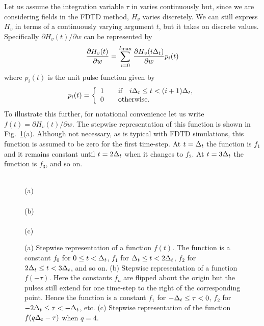 Let us assume the integration variable $\tau$ in
 varies continuously but, since we are
considering fields in the FDTD method, $H_v$ varies discretely.  We
can still express $H_v$ in terms of a continuously varying argument
$t$, but it takes on discrete values.  Specifically $\partial
H_v(t)/\partial w$ can be represented by
\begin{equation}
  \frac{\partial H_v(t)}{\partial w} =
  \sum_{i=0}^{I_{\mbox{\scriptsize max}}}
   \frac{\partial H_v(i\Delta_t)}{\partial w} p_i(t)
\end{equation}
where $p_i(t)$ is the unit pulse function given by
\begin{equation}
p_i(t) =\left\{
\begin{array}{l}
1 \qquad \mbox{if}\quad i\Delta_t\leq t < (i+1)\Delta_t, \\
0 \qquad \mbox{otherwise}.
\end{array}
\right.
\end{equation}
To illustrate this further, for notational convenience let us
write $f(t) = \partial H_v(t)/\partial w$.  The stepwise
representation of this function is shown in Fig.\
\ref{fig:stepwise}(a).  Although not necessary, as is typical with
FDTD simulations, this function is assumed to be zero for the first
time-step.  At $t=\Delta_t$ the function is $f_1$ and it remains constant
until $t=2\Delta_t$ when it changes to $f_2$.  At $t=3\Delta_t$ the function
is $f_3$, and so on.
\begin{figure}
  \begin{center}
   \\
  (a)\\
  \vspace{.15in}
  \\
  (b) \\
  \vspace{.15in}
  \\
  (c)
\mbox{}
\end{center} 
\caption{(a) Stepwise representation of a function
  $f(t)$.  The function is a constant $f_0$ for $0\leq t< \Delta_t$,
  $f_1$ for $\Delta_t \leq t< 2\Delta_t$, $f_2$ for $2 \Delta_t \leq t <
  3\Delta_t$, and so on. (b) Stepwise representation of a function
  $f(-\tau)$.  Here the constants $f_n$ are flipped about the origin
  but the pulses still extend for one time-step to the right of the
  corresponding point.  Hence the function is a constant $f_1$ for
  $-\Delta_t\leq\tau<0$, $f_2$ for $-2\Delta_t\leq\tau<-\Delta_t$, etc. (c)
  Stepwise representation of the function $f(q\Delta_t-\tau)$ when
  $q=4$.}  \label{fig:stepwise}
\end{figure}

